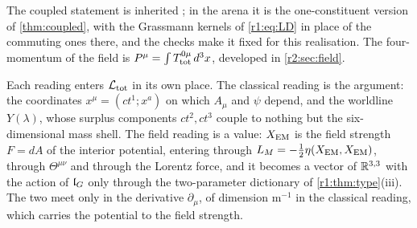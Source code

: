 The coupled statement is inherited \cite{WeinbergQFT}; in the arena it is the one-constituent version of \cref{thm:coupled}, with
the Grassmann kernels of \eqref{r1:eq:LD} in place of the commuting ones there, and the checks make it fixed for this realisation.  The four-momentum of the field is $P^\mu=\int T^{0\mu}_{\rm tot}\,d^3x$, developed in \cref{r2:sec:field}.

Each reading enters $\mathcal L_{\rm tot}$ in its own place. The classical reading is the argument: the coordinates $x^\mu=(ct^1;x^a)$ on which
$A_\mu$ and $\psi$ depend, and the worldline $Y(\lambda)$, whose surplus components $ct^2,ct^3$ couple to nothing but the six-dimensional
mass shell. The field reading is a value: $X_{\rm EM}$ is the field strength $F=dA$ of the interior potential, entering through
$L_M=-\tfrac12\eta(X_{\rm EM},X_{\rm EM})$, through $\Theta^{\mu\nu}$ and through the Lorentz force, and it becomes a vector of $\mathbb{R}^{3,3}$ with
the action of $\mathfrak l_G$ only through the two-parameter dictionary of \cref{r1:thm:type}(iii). The two meet only in the derivative
$\partial_\mu$, of dimension $\mathrm m^{-1}$ in the classical reading, which carries the potential to the field strength.

